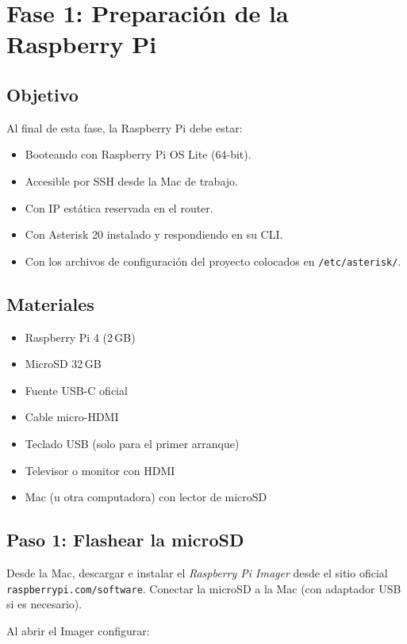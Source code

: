 \chapter{Fase 1: Preparación de la Raspberry Pi}

\section{Objetivo}

Al final de esta fase, la Raspberry Pi debe estar:

\begin{itemize}
  \item Booteando con Raspberry Pi OS Lite (64-bit).
  \item Accesible por SSH desde la Mac de trabajo.
  \item Con IP estática reservada en el router.
  \item Con Asterisk 20 instalado y respondiendo en su CLI.
  \item Con los archivos de configuración del proyecto colocados en \texttt{/etc/asterisk/}.
\end{itemize}

\section{Materiales}

\begin{itemize}
  \item Raspberry Pi 4 (2\,GB)
  \item MicroSD 32\,GB
  \item Fuente USB-C oficial
  \item Cable micro-HDMI
  \item Teclado USB (solo para el primer arranque)
  \item Televisor o monitor con HDMI
  \item Mac (u otra computadora) con lector de microSD
\end{itemize}

\section{Paso 1: Flashear la microSD}

Desde la Mac, descargar e instalar el \emph{Raspberry Pi Imager} desde el sitio oficial \texttt{raspberrypi.com/software}. Conectar la microSD a la Mac (con adaptador USB si es necesario).

Al abrir el Imager configurar:

